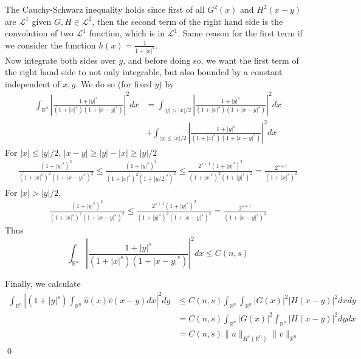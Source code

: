 \documentclass[12pt]{article}
\begin{document}
The Cauchy-Schwarz inequality holds since first of all $G^2(x)$ and $H^2(x-y)$ are $\mathscr{L}^1$ given $G,H\in\mathscr{L}^2$, then the second term of the right hand side is the convolution of two $\mathscr{L}^1$ function, which is in $\mathscr{L}^1$. Same reason for the first term if we consider the function $h(x)=\frac{1}{1+|x|^s}$. \\
\indent Now integrate both sides over $y$, and before doing so, we want the first term of the right hand side to not only integrable, but also bounded by a constant independent of $x,y$. We do so (for fixed $y$) by 
\begin{align}
    \int_{\mathbb{R}^n}\left|\frac{1+|y|^s}{(1+|x|^s)(1+|x-y|^s)}\right|^2dx &= \int_{|y|>|x|/2}\left|\frac{1+|y|^s}{(1+|x|^s)(1+|x-y|^s)}\right|^2dx \\
    &+\int_{|y|\leq |x|/2}\left|\frac{1+|y|^s}{(1+|x|^s)(1+|x-y|^s)}\right|^2dx
\end{align}
For $|x|\leq |y|/2$, $|x-y|\geq |y|-|x|\geq |y|/2$
\begin{align*}
    \frac{(1+|y|^s)^2}{(1+|x|^s)^2(1+|x-y|^s)^2}\leq \frac{(1+|y|^s)^2}{(1+|x|^s)^2(1+|y/2|^s)^2}\leq \frac{2^{s+1}(1+|y|^s)^2}{(1+|x|^s)^2(1+|y|^s)^2}=\frac{2^{s+1}}{(1+|x|^s)^2}
\end{align*}
For $|x|>|y|/2$,
\begin{align*}
    \frac{(1+|y|^s)^2}{(1+|x|^s)^2(1+|x-y|^s)^2}\leq \frac{2^{s+1}(1+|y|^s)^2}{(1+|y|^s)^2(1+|x-y|^s)^2}=\frac{2^{s+1}}{(1+|x-y|^s)^2}
\end{align*}
Thus 
$$
\int_{\mathbb{R}^n}\left|\frac{1+|y|^s}{(1+|x|^s)(1+|x-y|^s)}\right|^2dx\leq C(n,s)
$$

Finally, we calculate
\begin{align*}
    \int_{\mathbb{R}^n}\left|(1+|y|^s)\int_{\mathbb{R}^n}\hat{u}(x)\hat{v}(x-y)dx\right|^2dy&\leq C(n, s)\int_{\mathbb{R}^n}\int_{\mathbb{R}^n}|G(x)|^2|H(x-y)|^2dxdy \\
    &=C(n,s)\int_{\mathbb{R}^n}|G(x)|^2\int_{\mathbb{R}^n}|H(x-y)|^2dydx \\
    &=C(n,s)\|u\|_{H^s(\mathbb{R}^n)}\|v\|_{\mathbb{R}^n}
\end{align*} \qed
\end{document}
